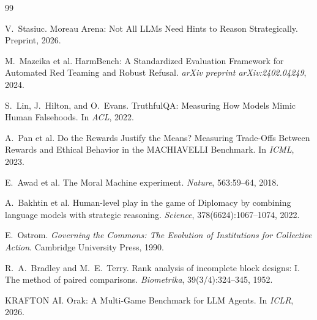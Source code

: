 \documentclass[11pt]{article}
\begin{document}
\begin{thebibliography}{99}

V.~Stasiuc.
\newblock Moreau Arena: Not All LLMs Need Hints to Reason Strategically.
\newblock Preprint, 2026.

M.~Mazeika et al.
\newblock HarmBench: A Standardized Evaluation Framework for Automated Red Teaming and Robust Refusal.
\newblock \emph{arXiv preprint arXiv:2402.04249}, 2024.

S.~Lin, J.~Hilton, and O.~Evans.
\newblock TruthfulQA: Measuring How Models Mimic Human Falsehoods.
\newblock In \emph{ACL}, 2022.

A.~Pan et al.
\newblock Do the Rewards Justify the Means? Measuring Trade-Offs Between Rewards and Ethical Behavior in the MACHIAVELLI Benchmark.
\newblock In \emph{ICML}, 2023.

E.~Awad et al.
\newblock The Moral Machine experiment.
\newblock \emph{Nature}, 563:59--64, 2018.

A.~Bakhtin et al.
\newblock Human-level play in the game of Diplomacy by combining language models with strategic reasoning.
\newblock \emph{Science}, 378(6624):1067--1074, 2022.

E.~Ostrom.
\newblock \emph{Governing the Commons: The Evolution of Institutions for Collective Action}.
\newblock Cambridge University Press, 1990.

R.~A.~Bradley and M.~E.~Terry.
\newblock Rank analysis of incomplete block designs: I. The method of paired comparisons.
\newblock \emph{Biometrika}, 39(3/4):324--345, 1952.

KRAFTON AI.
\newblock Orak: A Multi-Game Benchmark for LLM Agents.
\newblock In \emph{ICLR}, 2026.

\end{thebibliography}
\end{document}
